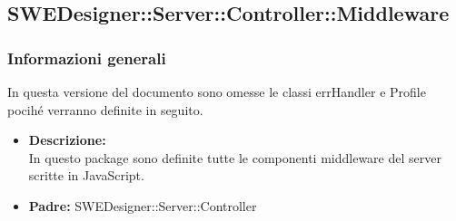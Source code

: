   \subsection{SWEDesigner::Server::Controller::Middleware}
    \subsubsection{Informazioni generali}
      In questa versione del documento sono omesse le classi errHandler e Profile pocihé verranno definite in seguito.
      \begin{itemize}
        \item \textbf{Descrizione: }\\
        In questo package sono definite tutte le componenti middleware del server scritte in JavaScript.
        \item \textbf{Padre: }SWEDesigner::Server::Controller
      \end{itemize}
